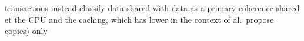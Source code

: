 transactions
instead classify
data
% 
shared
with data
% 
as a primary
coherence
shared
et
the CPU and the
caching, which has lower
% 
in the context of
al.~propose 
copies) only 
